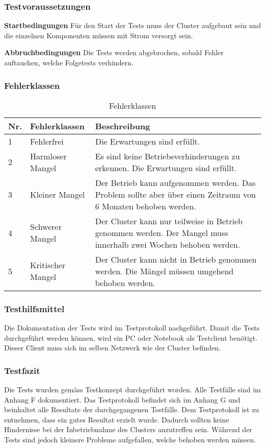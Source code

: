 \subsubsection{Testvoraussetzungen}
\textbf{Startbedingungen}\newline
Für den Start der Tests muss der Cluster aufgebaut sein und die einzelnen Komponenten müssen mit Strom versorgt sein. 

\textbf{Abbruchbedingungen}\newline
Die Tests werden abgebrochen, sobald Fehler auftauchen, welche Folgetests verhindern.

\subsubsection{Fehlerklassen}
\begin{table}[H]
\centering
\begin{tabular}{p{1cm}p{4cm}p{11cm}}
\hline
\rowcolor{heading} \textbf{Nr.} & \textbf{Fehlerklassen} & \textbf{Beschreibung} \\\hline
1 & Fehlerfrei & Die Erwartungen sind erfüllt.  \\\hline
2 & Harmloser Mangel & Es sind keine Betriebsverhinderungen zu erkennen. Die Erwartungen sind erfüllt. \\\hline
3 & Kleiner Mangel & Der Betrieb kann aufgenommen werden. Das Problem sollte aber über einen Zeitraum von 6 Monaten behoben werden.  \\\hline
4 & Schwerer Mangel & Der Cluster kann nur teilweise in Betrieb genommen werden. Der Mangel muss innerhalb zwei Wochen behoben werden. \\\hline
5 & Kritischer Mangel & Der Cluster kann nicht in Betrieb genommen werden. Die Mängel müssen umgehend behoben werden. \\\hline
\end{tabular}
\caption{Fehlerklassen}
\end{table}

\subsubsection{Testhilfsmittel}
Die Dokumentation der Tests wird im Testprotokoll nachgeführt. Damit die Tests durchgeführt werden können, wird ein PC oder Notebook als Testclient benötigt. Dieser Client muss sich im selben Netzwerk wie der Cluster befinden.


\subsubsection{Testfazit}
Die Tests wurden gemäss Testkonzept durchgeführt worden. Alle Testfälle sind im Anhang F dokumentiert. Das Testprotokoll befindet sich im Anhang G und beinhaltet alle Resultate der durchgegangenen Testfälle. Dem Testprotokoll ist zu entnehmen, dass ein gutes Resultat erzielt wurde. Dadurch sollten keine Hindernisse bei der Inbetriebnahme des Clusters anzutreffen sein. Während der Tests sind jedoch kleinere Probleme aufgefallen, welche behoben werden müssen.\newline

